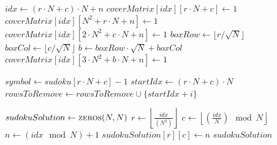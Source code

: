 \documentclass{beamer}
\begin{document}
\begin{frame}{}
    \begin{algorithmic}
                        \State $idx \gets (r\cdot N + c)\cdot N + n$
                        \State $coverMatrix[idx][r\cdot N + c] \gets 1$
                        \State $coverMatrix[idx][N^2 + r\cdot N + n] \gets 1$
                        \State $coverMatrix[idx][2\cdot N^2 + c\cdot N + n] \gets 1$
                        \State $boxRow \gets \lfloor r / \sqrt{N} \rfloor$
                        \State $boxCol \gets \lfloor c / \sqrt{N} \rfloor$
                        \State $b \gets boxRow\cdot \sqrt{N} + boxCol$
                        \State $coverMatrix[idx][3\cdot N^2 + b\cdot N + n] \gets 1$
                    \EndFor
                \EndFor
            \EndFor
        \EndFunction
    \end{algorithmic}
\end{frame}

\begin{frame}{}
    \begin{algorithmic}
                    \State $symbol \gets sudoku[r\cdot N + c] - 1$ 
                        \State $startIdx \gets (r\cdot N + c)\cdot N$
                                \State $rowsToRemove \gets rowsToRemove \cup \{startIdx + i\}$
                            \EndIf
                        \EndFor
                    \EndIf
                \EndFor
            \EndFor
        \EndFunction
    \end{algorithmic}
\end{frame}

\begin{frame}{}
    
        
    \begin{algorithmic}
            \State $sudokuSolution \gets \Call{zeros}{N, N}$
                \State $r \gets \left\lfloor \frac{idx}{(N^2)} \right\rfloor$
                \State $c \gets \left\lfloor (\frac{idx}{N}) \mod N \right\rfloor$
                \State $n \gets (idx \mod N) + 1$
                \State $sudokuSolution[r][c] \gets n$
            \EndFor
            \State \Return $sudokuSolution$
        \EndFunction
    \end{algorithmic}
\end{frame}
\end{document}
